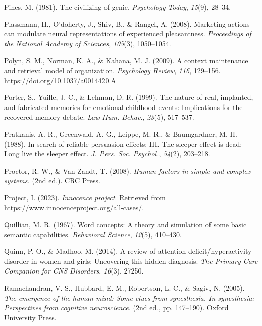 \documentclass[
]{krantz}
\newlength{\cslhangindent}
\newenvironment{CSLReferences}[2] %
 {\begin{list}{}{%
  \setlength{\itemindent}{0pt}
  \setlength{\leftmargin}{0pt}
  \setlength{\parsep}{0pt}
  \ifodd #1
   \setlength{\leftmargin}{\cslhangindent}
   \setlength{\itemindent}{-1\cslhangindent}
  \fi
  \setlength{\itemsep}{#2\baselineskip}}}
 {\end{list}}
\begin{document}
\begin{CSLReferences}{1}{0}
Pines, M. (1981). The civilizing of genie. \emph{Psychology Today}, \emph{15}(9), 28--34.

Plassmann, H., O'doherty, J., Shiv, B., \& Rangel, A. (2008). Marketing actions can modulate neural representations of experienced pleasantness. \emph{Proceedings of the National Academy of Sciences}, \emph{105}(3), 1050--1054.

Polyn, S. M., Norman, K. A., \& Kahana, M. J. (2009). A context maintenance and retrieval model of organization. \emph{Psychology Review}, \emph{116}, 129--156. \url{https://doi.org/10.1037/a0014420.A}

Porter, S., Yuille, J. C., \& Lehman, D. R. (1999). The nature of real, implanted, and fabricated memories for emotional childhood events: Implications for the recovered memory debate. \emph{Law Hum. Behav.}, \emph{23}(5), 517--537.

Pratkanis, A. R., Greenwald, A. G., Leippe, M. R., \& Baumgardner, M. H. (1988). In search of reliable persuasion effects: {III}. The sleeper effect is dead: Long live the sleeper effect. \emph{J. Pers. Soc. Psychol.}, \emph{54}(2), 203--218.

Proctor, R. W., \& Van Zandt, T. (2008). \emph{Human factors in simple and complex systems.} (2nd ed.). CRC Press.

Project, I. (2023). \emph{Innocence project}. Retrieved from \url{https://www.innocenceproject.org/all-cases/}.

Quillian, M. R. (1967). Word concepts: A theory and simulation of some basic semantic capabilities. \emph{Behavioral Science}, \emph{12}(5), 410--430.

Quinn, P. O., \& Madhoo, M. (2014). A review of attention-deficit/hyperactivity disorder in women and girls: Uncovering this hidden diagnosis. \emph{The Primary Care Companion for CNS Disorders}, \emph{16}(3), 27250.

Ramachandran, V. S., Hubbard, E. M., Robertson, L. C., \& Sagiv, N. (2005). \emph{The emergence of the human mind: Some clues from synesthesia. In synesthesia: Perspectives from cognitive neuroscience.} (2nd ed., pp. 147--190). Oxford University Press.


\end{CSLReferences}
\end{document}
